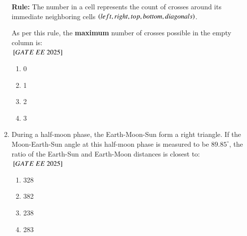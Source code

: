 \documentclass[journal,12pt,onecolumn]{IEEEtran}
\theoremstyle{remark}
\begin{document}
\begin{enumerate}
\medskip

\textbf{Rule:} The number in a cell represents the count of crosses around its immediate neighboring cells $\left(left, right, top, bottom, diagonals\right)$.

\medskip

As per this rule, the \textbf{maximum} number of crosses possible in the empty column is:
 \\    
${}\left[GATE\ EE\ 2025\right]$\\
    \begin{enumerate}[label=(\Alph*)]
\item 0 \\     
  \item 1\\ 
  \item 2\\ 
 \item 3\\  
    \end{enumerate}

   \item During a half-moon phase, the Earth-Moon-Sun form a right triangle. If the Moon-Earth-Sun angle at this half-moon phase is measured to be \(89.85^\circ\), the ratio of the Earth-Sun and Earth-Moon distances is closest to: \\    
${}\left[GATE\ EE\ 2025\right]$\\
    \begin{enumerate}[label=(\Alph*)]
\item 328 \\  
  \item 382 \\  
 \item 238 \\  
  \item 283 \\  
    \end{enumerate}


\end{enumerate}
\end{document}
